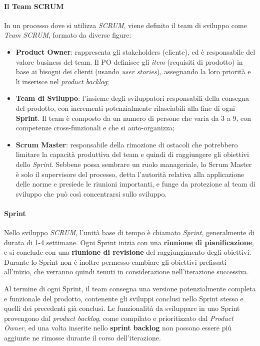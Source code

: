 \documentclass[../main.tex]{subfiles}
\begin{document}
        		\paragraph{Il Team SCRUM}
        		In un processo dove si utilizza \emph{SCRUM}, viene definito il team di sviluppo come \emph{Team SCRUM}, formato da diverse figure:
        		\begin{itemize}
        			\item \textbf{Product Owner}: rappresenta gli stakeholders (cliente), ed è responsabile del valore business del team. Il PO definisce gli \emph{item} (requisiti di prodotto) in base ai bisogni dei clienti (usando \emph{user stories}), assegnando la loro priorità e li inserisce nel \emph{product backlog};
        			\item \textbf{Team di Sviluppo}: l'insieme degli sviluppatori responsabili della consegna del prodotto, con incrementi potenzialmente rilasciabili alla fine di ogni \textbf{Sprint}. Il team è composto da un numero di persone che varia da 3 a 9, con competenze cross-funzionali e che si auto-organizza;
        			\item \textbf{Scrum Master}: responsabile della rimozione di ostacoli che potrebbero limitare la capacità produttiva del team e quindi di raggiungere gli obiettivi dello \emph{Sprint}. Sebbene possa sembrare un ruolo manageriale,
        			lo Scrum Master è solo il supervisore del processo, detta l'autorità relativa alla applicazione delle norme e presiede le riunioni importanti, e funge da protezione al team di sviluppo che può così concentrarsi sullo sviluppo.
        		\end{itemize}
        	
        		\paragraph{Sprint}
        		Nello sviluppo \emph{SCRUM}, l'unità base di tempo è chiamato \emph{Sprint}, generalmente di durata di 1-4 settimane. Ogni Sprint inizia con una \textbf{riunione di pianificazione}, e si conclude con una \textbf{riunione di revisione} del raggiungimento degli obiettivi. Durante lo Sprint non è inoltre permesso cambiare gli obiettivi prefissati all'inizio, che verranno quindi tenuti in considerazione nell'iterazione successiva.
        		
        		Al termine di ogni Sprint, il team consegna una versione potenzialmente completa e funzionale del prodotto, contenente gli sviluppi conclusi nello Sprint stesso e quelli dei precedenti già conclusi.
        		Le funzionalità da sviluppare in uno Sprint provengono dal \emph{product backlog}, come compilato e prioritizzato dal \emph{Product Owner}, ed una volta inserite nello \textbf{sprint backlog} non possono essere più aggiunte ne rimosse durante il corso dell'iterazione.
        		
\end{document}

